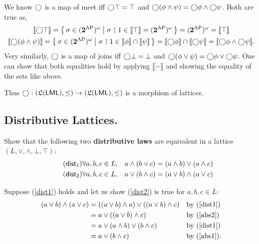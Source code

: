 \documentclass[fontsize=16pt,a4paper,DIV=17,parskip=half]{scrartcl}
\renewcommand{\mathsf}[1]{\textup{\textsf{#1}}}
\theoremstyle{definition}
\begin{document}
  We know $\bigcirc$ is a map of meet iff $\bigcirc \top = \top$ and  $\bigcirc (\phi \land \psi) = \bigcirc \phi \land \bigcirc \psi$.
  Both are true as,
  \begin{gather*}
    \llbracket \bigcirc \top\rrbracket  = \big\{\,\sigma \in (\mathbf{2}^\mathrm{AP})^\omega  \;\big|\; \sigma \upharpoonright 1 \in \llbracket \top\rrbracket = (\mathbf{2}^\mathrm{AP})^\omega\,\big\}  = (\mathbf{2}^\mathrm{AP})^\omega = \llbracket \top\rrbracket  \\
    \llbracket \bigcirc (\phi \land \psi)\rrbracket = \big\{\,\sigma \in (\mathbf{2}^\mathrm{AP})^\omega  \;\big|\; \sigma \upharpoonright 1 \in \llbracket \phi\rrbracket \cap \llbracket \psi\rrbracket  \,\big\}  = \llbracket \bigcirc \phi\rrbracket   \cap \llbracket \bigcirc \psi\rrbracket  = \llbracket \bigcirc \phi \land \bigcirc \psi\rrbracket  .
  \end{gather*}
  Very similarly, $\bigcirc$  is a map of joins iff $\bigcirc \bot = \bot$ and  $\bigcirc (\phi \lor \psi) = \bigcirc \phi \lor \bigcirc \psi$.
  One can show that both equalities hold by applying $\llbracket -\rrbracket$ and showing the equality of the sets like above.

  Thus $\nxt : (\mathfrak L(\mathsf{LML}), \le) \to (\mathfrak L(\mathsf{LML}), \le)$ is a morphism of lattices.

  \subsection{Distributive Lattices.}

  \begin{que}
    Show that the following two \textbf{distributive laws} are equivalent in a lattice $(L, \vee, \wedge, \bot, \top)$:
    \begin{align}
      \tag{\textsf{dist}\textsubscript{1}}
      \forall a, b, c \in L, \quad &a \wedge (b \vee c) = (a \wedge b) \vee (a \wedge c)
      \label{dist1}
      \\
      \tag{\textsf{dist}\textsubscript{2}}
      \forall a, b, c \in L, \quad &a \vee (b \wedge c) = (a \vee b) \wedge (a \vee c)
      \label{dist2}
    \end{align}
  \end{que}

  Suppose (\ref{dist1}) holds and let us show (\ref{dist2}) is true for $a, b, c \in L$:
  \begin{align*}
    (a \vee b) \wedge (a \vee c)
    &= ((a \vee b) \wedge a) \vee ((a \vee b) \wedge c) && \text{by (\ref{dist1})}\\
    &= a \vee ((a \vee b) \wedge c) && \text{by (\ref{abs2})} \\
    &= a \vee (a \wedge b) \vee (b \wedge c) && \text{by (\ref{dist1})} \\
    &= a \vee (b \wedge c) && \text{by (\ref{abs1})} .
  \end{align*}
\end{document}
